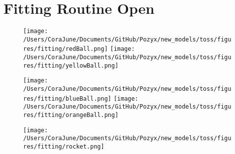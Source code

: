 \documentclass{article}
\begin{document}
\section{Fitting Routine Open}
\begin{figure}[h!]
\begin{multicols}{2}
    \texttt{[image: /Users/CoraJune/Documents/GitHub/Pozyx/new\_models/toss/figures/fitting/redBall.png]}
    \texttt{[image: /Users/CoraJune/Documents/GitHub/Pozyx/new\_models/toss/figures/fitting/yellowBall.png]}
\end{multicols}

\begin{multicols}{2}
    \texttt{[image: /Users/CoraJune/Documents/GitHub/Pozyx/new\_models/toss/figures/fitting/blueBall.png]}
    \texttt{[image: /Users/CoraJune/Documents/GitHub/Pozyx/new\_models/toss/figures/fitting/orangeBall.png]}
\end{multicols}

    \texttt{[image: /Users/CoraJune/Documents/GitHub/Pozyx/new\_models/toss/figures/fitting/rocket.png]}
\end{figure}

\end{document}
